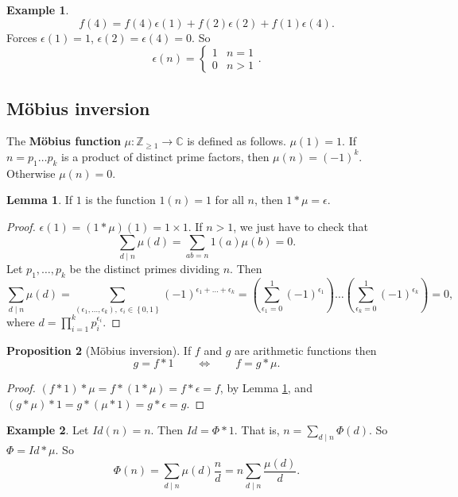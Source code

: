 \documentclass{article}
\newcommand{\Z}{\mathbb{Z}}
\newcommand{\C}{\mathbb{C}}
\newcommand{\rb}[1]{\left( #1 \right)}
\newcommand{\cb}[1]{\left\{ #1 \right\}}
\theoremstyle{definition}\newtheorem{definition}{Definition}
\theoremstyle{definition}\newtheorem{remark}[definition]{Remark}
\theoremstyle{definition}\newtheorem*{example}{Example}
\theoremstyle{definition}\newtheorem*{note}{Note}
\newtheorem{proposition}[definition]{Proposition}
\newtheorem{lemma}[definition]{Lemma}
\begin{document}
\begin{example}
$$ f\rb{4} = f\rb{4}\epsilon\rb{1} + f\rb{2}\epsilon\rb{2} + f\rb{1}\epsilon\rb{4}. $$
Forces $ \epsilon\rb{1} = 1 $, $ \epsilon\rb{2} = \epsilon\rb{4} = 0 $. So
$$ \epsilon\rb{n} = \begin{cases}
1 & n = 1 \\
0 & n > 1
\end{cases}. $$
\end{example}

\subsection{M\"obius inversion}

The \textbf{M\"obius function} $ \mu : \Z_{\ge 1} \to \C $ is defined as follows. $ \mu\rb{1} = 1 $. If $ n = p_1 \dots p_k $ is a product of distinct prime factors, then $ \mu\rb{n} = \rb{-1}^k $. Otherwise $ \mu\rb{n} = 0 $.

\begin{lemma}
\label{lem:103}
If $ 1 $ is the function $ 1\rb{n} = 1 $ for all $ n $, then $ 1 * \mu = \epsilon $.
\end{lemma}

\begin{proof}
$ \epsilon\rb{1} = \rb{1 * \mu}\rb{1} = 1 \times 1 $. If $ n > 1 $, we just have to check that
$$ \sum_{d \mid n} \mu\rb{d} = \sum_{ab = n} 1\rb{a}\mu\rb{b} = 0. $$
Let $ p_1, \dots, p_k $ be the distinct primes dividing $ n $. Then
$$ \sum_{d \mid n} \mu\rb{d} = \sum_{\rb{\epsilon_1, \dots, \epsilon_k}, \ \epsilon_i \in \cb{0, 1}} \rb{-1}^{\epsilon_1 + \dots + \epsilon_k} = \rb{\sum_{\epsilon_1 = 0}^1 \rb{-1}^{\epsilon_1}} \dots \rb{\sum_{\epsilon_k = 0}^1 \rb{-1}^{\epsilon_k}} = 0, $$
where $ d = \prod_{i = 1}^k p_i^{\epsilon_i} $.
\end{proof}

\begin{proposition}[M\"obius inversion]
If $ f $ and $ g $ are arithmetic functions then
$$ g = f * 1 \qquad \iff \qquad f = g * \mu. $$
\end{proposition}

\begin{proof}
$ \rb{f * 1} * \mu = f * \rb{1 * \mu} = f * \epsilon = f $, by Lemma \ref{lem:103}, and $ \rb{g * \mu} * 1 = g * \rb{\mu * 1} = g * \epsilon = g $.
\end{proof}

\begin{example}
Let $ Id\rb{n} = n $. Then $ Id = \Phi * 1 $. That is, $ n = \sum_{d \mid n} \Phi\rb{d} $. So $ \Phi = Id * \mu $. So
$$ \Phi\rb{n} = \sum_{d \mid n} \mu\rb{d}\dfrac{n}{d} = n\sum_{d \mid n} \dfrac{\mu\rb{d}}{d}. $$
\end{example}
\end{document}
